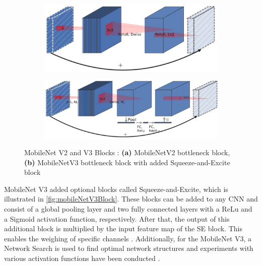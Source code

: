 \begin{figure}[H]
    \centering
    \begin{subfigure}{0.6\textwidth}
        \centering
        \includegraphics[width=\linewidth, keepaspectratio]{PICs/backbones/mobilenetv2_bottleneck.jpg}
        \caption{}
        \label{fig:mobileNetV2Block}
    \end{subfigure}
    \qquad
    \begin{subfigure}{0.6\textwidth}
        \centering
        \vspace{0.8cm}
        \includegraphics[width=\linewidth, keepaspectratio]{PICs/backbones/mobilenetv3_bottleneck_SE.jpg}
        \caption{}
        \label{fig:mobileNetV3Block}
    \end{subfigure}
    \caption{MobileNet V2 and V3 Blocks \cite{MobileNetV3}: \textbf{(a)} MobileNetV2 bottleneck block, \textbf{(b)} MobileNetV3 bottleneck block with added Squeeze-and-Excite block}
    \label{fig:mobileNetBlocks}
\end{figure}


\noindent MobileNet V3 added optional blocks called Squeeze-and-Excite, which is illustrated in \autoref{fig:mobileNetV3Block}. 
These blocks can be added to any \ac{CNN} and consist of a global pooling layer and two fully connected layers with a ReLu and a Sigmoid activation function, respectively.
After that, the output of this additional block is multiplied by the input feature map of the SE block.
This enables the weighing of specific channels \cite{SqueezeAndExcitation2019}.
Additionally, for the MobileNet V3, a Network Search is used to find optimal network structures and experiments with various activation functions have been conducted \cite{MobileNetV3}.

